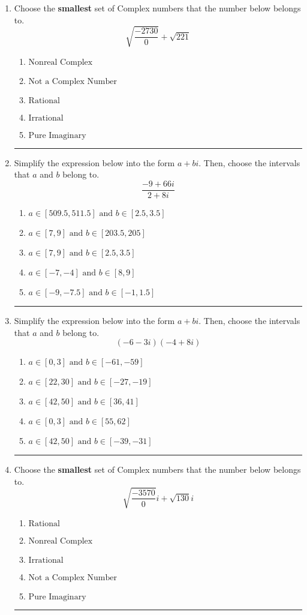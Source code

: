 \documentclass[14pt]{extbook}
\newcommand{\litem}[1]{\item#1\hspace*{-1cm}\rule{\textwidth}{0.4pt}}
\begin{document}
\begin{enumerate}
\litem{
Choose the \textbf{smallest} set of Complex numbers that the number below belongs to.\[ \sqrt{\frac{-2730}{0}}+\sqrt{221} \]\begin{enumerate}[label=\Alph*.]
\item \( \text{Nonreal Complex} \)
\item \( \text{Not a Complex Number} \)
\item \( \text{Rational} \)
\item \( \text{Irrational} \)
\item \( \text{Pure Imaginary} \)

\end{enumerate} }
\litem{
Simplify the expression below into the form $a+bi$. Then, choose the intervals that $a$ and $b$ belong to.\[ \frac{-9 + 66 i}{2 + 8 i} \]\begin{enumerate}[label=\Alph*.]
\item \( a \in [509.5, 511.5] \text{ and } b \in [2.5, 3.5] \)
\item \( a \in [7, 9] \text{ and } b \in [203.5, 205] \)
\item \( a \in [7, 9] \text{ and } b \in [2.5, 3.5] \)
\item \( a \in [-7, -4] \text{ and } b \in [8, 9] \)
\item \( a \in [-9, -7.5] \text{ and } b \in [-1, 1.5] \)

\end{enumerate} }
\litem{
Simplify the expression below into the form $a+bi$. Then, choose the intervals that $a$ and $b$ belong to.\[ (-6 - 3 i)(-4 + 8 i) \]\begin{enumerate}[label=\Alph*.]
\item \( a \in [0, 3] \text{ and } b \in [-61, -59] \)
\item \( a \in [22, 30] \text{ and } b \in [-27, -19] \)
\item \( a \in [42, 50] \text{ and } b \in [36, 41] \)
\item \( a \in [0, 3] \text{ and } b \in [55, 62] \)
\item \( a \in [42, 50] \text{ and } b \in [-39, -31] \)

\end{enumerate} }
\litem{
Choose the \textbf{smallest} set of Complex numbers that the number below belongs to.\[ \sqrt{\frac{-3570}{0}} i+\sqrt{130}i \]\begin{enumerate}[label=\Alph*.]
\item \( \text{Rational} \)
\item \( \text{Nonreal Complex} \)
\item \( \text{Irrational} \)
\item \( \text{Not a Complex Number} \)
\item \( \text{Pure Imaginary} \)


\end{enumerate}}
\end{enumerate}
\end{document}

